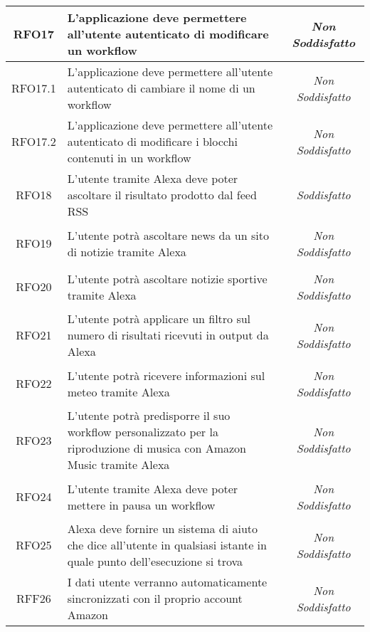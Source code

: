 \begin{longtable}{|c|>{\centering}m{7cm}|c|}
	\hypertarget{RFO17}{RFO17} & L'applicazione deve permettere all'utente autenticato di modificare un workflow & {\textit{Non Soddisfatto}}\\ \hline
	
	\hypertarget{RFO17.1}{RFO17.1} & L'applicazione deve permettere all'utente autenticato di cambiare il nome di un workflow & {\textit{Non Soddisfatto}}\\ \hline
	
	\hypertarget{RFO17.2}{RFO17.2} & L'applicazione deve permettere all'utente autenticato di modificare i blocchi contenuti in un workflow & {\textit{Non Soddisfatto}}\\ \hline
	
	\hypertarget{RFO18}{RFO18} & L'utente tramite Alexa deve poter ascoltare il risultato prodotto dal feed RSS & {\textit{Soddisfatto}}\\ \hline
	
	\hypertarget{RFO19}{RFO19} & L'utente potrà ascoltare news da un sito di notizie tramite Alexa & {\textit{Non Soddisfatto}}\\ \hline
	
	\hypertarget{RFO20}{RFO20} & L'utente potrà ascoltare notizie sportive tramite Alexa & {\textit{Non Soddisfatto}}\\ \hline
	
	\hypertarget{RFO21}{RFO21} & L'utente potrà applicare un filtro sul numero di risultati ricevuti in output da Alexa & {\textit{Non Soddisfatto}}\\ \hline
	
	\hypertarget{RFO22}{RFO22} & L'utente potrà ricevere informazioni sul meteo tramite Alexa & {\textit{Non Soddisfatto}}\\ \hline
	
	\hypertarget{RFO23}{RFO23} & L'utente potrà predisporre il suo workflow personalizzato per la riproduzione di musica con Amazon Music tramite Alexa & {\textit{Non Soddisfatto}}\\ \hline
	
	\hypertarget{RFO24}{RFO24} & L'utente tramite Alexa deve poter mettere in pausa un workflow & {\textit{Non Soddisfatto}}\\ \hline
	
	\hypertarget{RFO25}{RFO25} & Alexa deve fornire un sistema di aiuto che dice all'utente in qualsiasi istante in quale punto dell'esecuzione si trova & {\textit{Non Soddisfatto}}\\ \hline
	
	\hypertarget{RFF26}{RFF26} & I dati utente verranno automaticamente sincronizzati con il proprio account Amazon & {\textit{Non Soddisfatto}}\\ \hline
	

\end{longtable}
